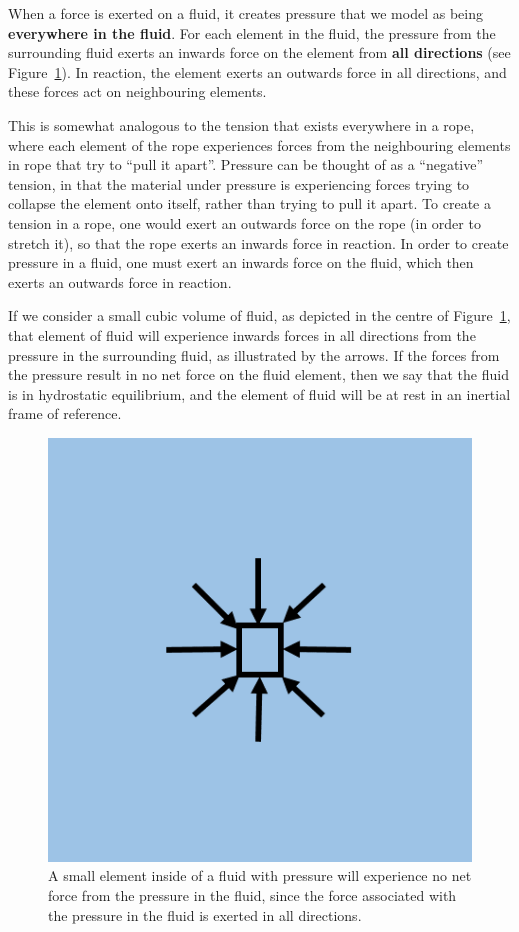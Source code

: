 
When a force is exerted on a fluid, it creates pressure that we model as being \textbf{everywhere in the fluid}.
For each element in the fluid, the pressure from the surrounding fluid exerts an inwards force on the element from \textbf{all directions} (see Figure~\ref{fig:fluidmechanics:pressure}). In reaction, the element exerts an outwards force in all directions, and these forces act on neighbouring elements.

This is somewhat analogous to the tension that exists everywhere in a rope, where each element of the rope experiences forces from the neighbouring elements in rope that try to ``pull it apart''. Pressure can be thought of as a ``negative'' tension, in that the material under pressure is experiencing forces trying to collapse the element onto itself, rather than trying to pull it apart. To create a tension in a rope, one would exert an outwards force on the rope (in order to stretch it), so that the rope exerts an inwards force in reaction. In order to create pressure in a fluid, one must exert an inwards force on the fluid, which then exerts an outwards force in reaction.

If we consider a small cubic volume of fluid, as depicted in the centre of Figure~\ref{fig:fluidmechanics:pressure}, that element of fluid will experience inwards forces in all directions from the pressure in the surrounding fluid, as illustrated by the arrows. If the forces from the pressure result in no net force on the fluid element, then we say that the fluid is in hydrostatic equilibrium, and the element of fluid will be at rest in an inertial frame of reference.

\begin{figure}[!htbp]
\centering
\includegraphics[width=0.4\linewidth]{files/pressure-5816848d52c5e9d5fb3b5be554244cb1.png}
\caption[]{A small element inside of a fluid with pressure will experience no net force from the pressure in the fluid, since the force associated with the pressure in the fluid is exerted in all directions.}
\label{fig:fluidmechanics:pressure}
\end{figure}

